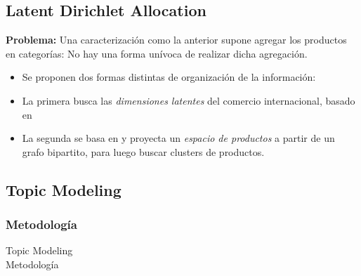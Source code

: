 \documentclass[compress]{beamer}
\begin{document}
\subsection{Latent Dirichlet Allocation}

\begin{frame}

\textbf{Problema:} Una caracterización como la anterior supone agregar los productos en categorías: No hay una forma unívoca de realizar dicha agregación.

\begin{itemize}[label=\faRebel]
	\item Se proponen dos formas distintas de organización de la información:
	\item La primera busca las \textit{dimensiones latentes} del comercio internacional, basado en \citep{blei2003latent}
	\item La segunda se basa en \cite{Hidalgo2007,Hidalgo2009} y proyecta un \textit{espacio de productos} a partir de un grafo bipartito, para luego buscar clusters de productos.
	
\end{itemize}
\end{frame}

\subsection{Topic Modeling}
\subsubsection{Metodología}

\begin{frame}
\centering
\Large Topic Modeling \\

\normalsize Metodología
\end{frame}
\end{document}
